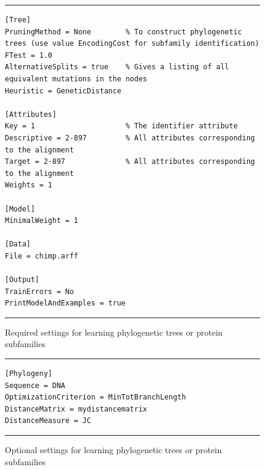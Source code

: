 \documentclass[a4paper]{report}
\begin{document}
\begin{figure}[tb]
\hrule\vspace{1em}
\begin{verbatim}
[Tree]
PruningMethod = None    	% To construct phylogenetic trees (use value EncodingCost for subfamily identification)
FTest = 1.0    
AlternativeSplits = true    % Gives a listing of all equivalent mutations in the nodes 
Heuristic = GeneticDistance

[Attributes]
Key = 1                     % The identifier attribute
Descriptive = 2-897         % All attributes corresponding to the alignment
Target = 2-897              % All attributes corresponding to the alignment
Weights = 1

[Model]
MinimalWeight = 1
    
[Data]
File = chimp.arff

[Output]
TrainErrors = No
PrintModelAndExamples = true
\end{verbatim}
\hrule
\caption{Required settings for learning phylogenetic trees or protein subfamilies}
\label{phylosettingsreq:fig}
\end{figure}

\begin{figure}[tb]
\hrule\vspace{1em}
\begin{verbatim}
[Phylogeny]
Sequence = DNA
OptimizationCriterion = MinTotBranchLength
DistanceMatrix = mydistancematrix
DistanceMeasure = JC
\end{verbatim}
\hrule
\caption{Optional settings for learning phylogenetic trees or protein subfamilies}
\label{phylosettingsopt:fig}
\end{figure}
\end{document}
